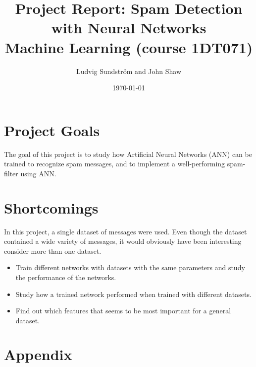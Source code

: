 \documentclass[a4paper,11pt]{article}
\title{\textbf{Project Report: Spam Detection with Neural Networks} \\
    \textbf{Machine Learning (course 1DT071)} \\  
}
\author{Ludvig Sundstr\"{o}m and John Shaw}
\date{\today}
\theoremstyle{definition}
\begin{document}
\maketitle
\newpage
\tableofcontents
\newpage

\section{Project Goals} 
  The goal of this project is to study how Artificial Neural Networks (ANN) can
  be trained to recognize spam messages, and to implement a well-performing
  spam-filter using ANN.







\section{Shortcomings}
  In this project, a single dataset of messages were used. Even though the
  dataset contained a wide variety of messages, it would obviously have been
  interesting consider more than one dataset.  
  \begin{itemize} 
    \item Train different networks with datasets with the same parameters and
      study the performance of the networks.
    \item Study how a trained network performed when trained with different
    datasets.  
    \item Find out which features that seems to be most important
      for a general dataset. 
  \end{itemize} 

\section{Appendix}
\end{document}
